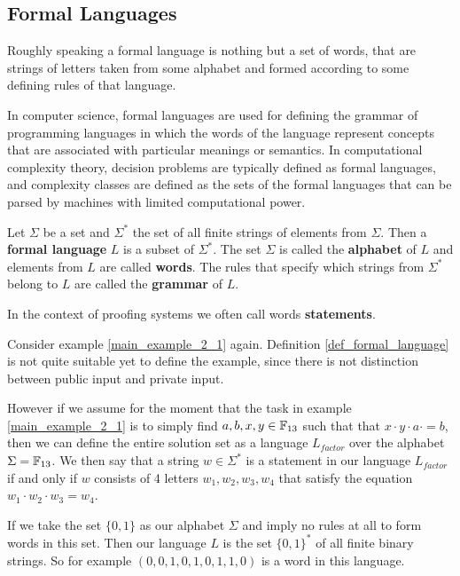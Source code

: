 \subsection{Formal Languages}
Roughly speaking a formal language is nothing but a set of words, that are strings of letters taken from some alphabet and formed according to some defining rules of that language. 

In computer science, formal languages are used for defining the grammar of programming languages in which the words of the language represent concepts that are associated with particular meanings or semantics. In computational complexity theory, decision problems are typically defined as formal languages, and complexity classes are defined as the sets of the formal languages that can be parsed by machines with limited computational power. 

\begin{definition}
\label{def_formal_language}
 Let $\Sigma$ be a set and $\Sigma^*$ the set of all finite strings of elements from $\Sigma$. Then a \textbf{formal language} $L$ is a subset of $\Sigma^*$. The set $\Sigma$ is called the \textbf{alphabet} of $L$ and elements from $L$ are called \textbf{words}. The rules that specify which strings from $\Sigma^*$ belong to $L$ are called the \textbf{grammar} of $L$. 

In the context of proofing systems we often call words \textbf{statements}.
\end{definition}

\begin{example}
\label{main_example_2_2}
Consider example \ref{main_example_2_1} again. Definition \ref{def_formal_language} is not quite suitable yet to define the example, since there is not distinction between public input and private input.

However if we assume for the moment that the task in example \ref{main_example_2_1} is to simply find $a,b,x,y\in \mathbb{F}_{13}$ such that that $x\cdot y\cdot a\cdot =b$, then we can define the entire solution set as a language $L_{factor}$ over the alphabet $\Sigma = \mathbb{F}_{13}$. We then say that a string $w\in \Sigma^*$ is a statement in our language $L_{factor}$ if and only if $w$ consists of 4 letters $w_1,w_2,w_3,w_4$ that satisfy the equation $w_1\cdot w_2\cdot w_3 =w_4$.
\end{example}

\begin{example} If we take the set $\{0,1\}$ as our alphabet $\Sigma$ and imply no rules at all to form words in this set. Then our language $L$ is the set $\{0,1\}^*$ of all finite binary strings. So for example $(0,0,1,0,1,0,1,1,0)$ is a word in this language.
\end{example}

